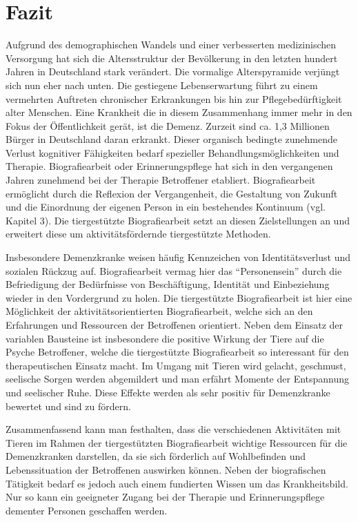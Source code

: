 \section{Fazit}
\label{sec:k5_Fazit}

Aufgrund des demographischen Wandels und einer verbesserten medizinischen Versorgung hat sich die Altersstruktur der Bevölkerung in den letzten hundert Jahren in Deutschland stark verändert. Die vormalige Alterspyramide verjüngt sich nun eher nach unten. Die gestiegene Lebenserwartung führt zu einem vermehrten Auftreten chronischer Erkrankungen bis hin zur Pflegebedürftigkeit alter Menschen. Eine Krankheit die in diesem Zusammenhang immer mehr in den Fokus der Öffentlichkeit gerät, ist die Demenz. Zurzeit sind ca. 1,3 Millionen Bürger in Deutschland daran erkrankt. Dieser organisch bedingte zunehmende Verlust kognitiver Fähigkeiten bedarf spezieller Behandlungsmöglichkeiten und Therapie. Biografiearbeit oder Erinnerungspflege hat sich in den vergangenen Jahren zunehmend bei der Therapie Betroffener etabliert. Biografiearbeit ermöglicht durch die Reflexion der Vergangenheit, die Gestaltung von Zukunft und die Einordnung der eigenen Person in ein bestehendes Kontinuum (vgl. Kapitel 3). Die tiergestützte Biografiearbeit setzt an diesen Zielstellungen an und erweitert diese um aktivitätsfördernde tiergestützte Methoden.

Insbesondere Demenzkranke weisen häufig Kennzeichen von Identitätsverlust und sozialen Rückzug auf. Biografiearbeit vermag hier das "`Personensein"' durch die Befriedigung der Bedürfnisse von Beschäftigung, Identität und Einbeziehung wieder in den Vordergrund zu holen. Die tiergestützte Biografiearbeit ist hier eine Möglichkeit der aktivitätsorientierten Biografiearbeit, welche sich an den Erfahrungen und Ressourcen der Betroffenen orientiert. Neben dem Einsatz der variablen Bausteine ist insbesondere die positive Wirkung der Tiere auf die Psyche Betroffener, welche die tiergestützte Biografiearbeit so interessant für den therapeutischen Einsatz macht. Im Umgang mit Tieren wird gelacht, geschmust, seelische Sorgen werden abgemildert und man erfährt Momente der Entspannung und seelischer Ruhe. Diese Effekte werden als sehr positiv für Demenzkranke bewertet und sind zu fördern. 

Zusammenfassend kann man festhalten, dass die verschiedenen Aktivitäten mit Tieren im Rahmen der tiergestützten Biografiearbeit wichtige Ressourcen für die Demenzkranken darstellen, da sie sich förderlich auf Wohlbefinden und Lebenssituation der Betroffenen auswirken können. Neben der biografischen Tätigkeit bedarf es jedoch auch einem fundierten Wissen um das Krankheitsbild. Nur so kann ein geeigneter Zugang bei der Therapie und Erinnerungspflege dementer Personen geschaffen werden.

